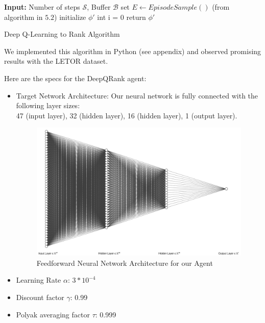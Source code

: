 \documentclass{article}
\begin{document}
\begin{algorithm}[H]
\SetAlgoLined
{}
 \textbf{Input:} Number of steps $\mathcal{S}$, Buffer $\mathcal{B}$\;
 set $E \leftarrow EpisodeSample()$ (from algorithm in $5.2$) \;
 initialize $\phi'$
 int i = 0\;
  return $\phi'$\;
\caption{Deep Q-Learning to Rank Algorithm}
\end{algorithm}

We implemented this algorithm in Python (see appendix) and observed promising results with the LETOR dataset.

Here are the specs for the DeepQRank agent:
\begin{itemize}
    \item Target Network Architecture: Our neural network is fully connected with the following layer sizes: \\ 
    47 (input layer), 32 (hidden layer), 16 (hidden layer), 1 (output layer).\\
    \begin{figure}[h]
        \centering
        \includegraphics[scale=0.3]{rfcn.png}
        \caption{Feedforward Neural Network Architecture for our Agent}
        \label{fig:my_label}
    \end{figure}
    \item Learning Rate $\alpha$: $3*10^{-4}$
    \item Discount factor $\gamma$: 0.99
    \item Polyak averaging factor $\tau$: 0.999
    
    
\end{itemize}
\end{document}
